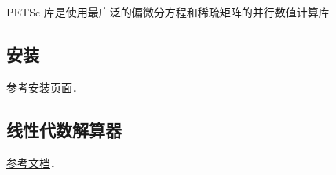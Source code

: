 
PETSc 库是使用最广泛的偏微分方程和稀疏矩阵的并行数值计算库

\subsection{安装}
参考\href{https://petsc.org/release/install/install_tutorial/}{安装页面}．


\subsection{线性代数解算器}
\href{https://petsc.org/release/docs/manual/ksp/}{参考文档}．
